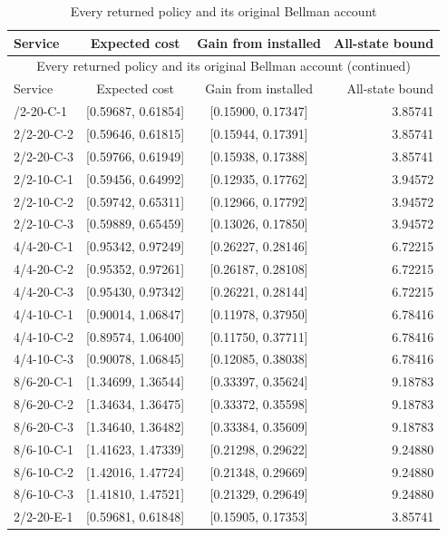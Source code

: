 \begingroup\small\setlength{\tabcolsep}{3pt}
\begin{longtable}{lccr}
\caption{Every returned policy and its original Bellman account}\label{tab:cost-registry57}\\
\hline
Service & Expected cost & Gain from installed & All-state bound \\
\hline
\endfirsthead
\multicolumn{4}{c}{Every returned policy and its original Bellman account (continued)}\\
\hline
Service & Expected cost & Gain from installed & All-state bound \\
\hline
\endhead
\hline
\endfoot
2/2-20-C-1 & [0.59687, 0.61854] & [0.15900, 0.17347] & 3.85741 \\
2/2-20-C-2 & [0.59646, 0.61815] & [0.15944, 0.17391] & 3.85741 \\
2/2-20-C-3 & [0.59766, 0.61949] & [0.15938, 0.17388] & 3.85741 \\
2/2-10-C-1 & [0.59456, 0.64992] & [0.12935, 0.17762] & 3.94572 \\
2/2-10-C-2 & [0.59742, 0.65311] & [0.12966, 0.17792] & 3.94572 \\
2/2-10-C-3 & [0.59889, 0.65459] & [0.13026, 0.17850] & 3.94572 \\
4/4-20-C-1 & [0.95342, 0.97249] & [0.26227, 0.28146] & 6.72215 \\
4/4-20-C-2 & [0.95352, 0.97261] & [0.26187, 0.28108] & 6.72215 \\
4/4-20-C-3 & [0.95430, 0.97342] & [0.26221, 0.28144] & 6.72215 \\
4/4-10-C-1 & [0.90014, 1.06847] & [0.11978, 0.37950] & 6.78416 \\
4/4-10-C-2 & [0.89574, 1.06400] & [0.11750, 0.37711] & 6.78416 \\
4/4-10-C-3 & [0.90078, 1.06845] & [0.12085, 0.38038] & 6.78416 \\
8/6-20-C-1 & [1.34699, 1.36544] & [0.33397, 0.35624] & 9.18783 \\
8/6-20-C-2 & [1.34634, 1.36475] & [0.33372, 0.35598] & 9.18783 \\
8/6-20-C-3 & [1.34640, 1.36482] & [0.33384, 0.35609] & 9.18783 \\
8/6-10-C-1 & [1.41623, 1.47339] & [0.21298, 0.29622] & 9.24880 \\
8/6-10-C-2 & [1.42016, 1.47724] & [0.21348, 0.29669] & 9.24880 \\
8/6-10-C-3 & [1.41810, 1.47521] & [0.21329, 0.29649] & 9.24880 \\
2/2-20-E-1 & [0.59681, 0.61848] & [0.15905, 0.17353] & 3.85741 \\

\end{longtable}
